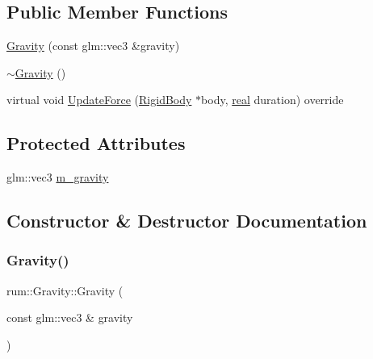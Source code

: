 \subsection*{Public Member Functions}
\begin{DoxyCompactItemize}
\item 
\hyperlink{classrum_1_1_gravity_a9fca05b6d906fec4c40507b0c738dff8}{Gravity} (const glm\+::vec3 \&gravity)
\item 
\hyperlink{classrum_1_1_gravity_a67fc63876df40007e8c7bde5e8a72569}{$\sim$\+Gravity} ()
\item 
virtual void \hyperlink{classrum_1_1_gravity_a721c721904536378636143b21486ea2c}{Update\+Force} (\hyperlink{classrum_1_1_rigid_body}{Rigid\+Body} $\ast$body, \hyperlink{namespacerum_a7e8cca23573d5eaead0f138cbaa4862c}{real} duration) override
\end{DoxyCompactItemize}
\subsection*{Protected Attributes}
\begin{DoxyCompactItemize}
\item 
glm\+::vec3 \hyperlink{classrum_1_1_gravity_a82c9f64363024c45e96ba851a612613b}{m\+\_\+gravity}
\end{DoxyCompactItemize}


\subsection{Constructor \& Destructor Documentation}
\mbox{\label{classrum_1_1_gravity_a9fca05b6d906fec4c40507b0c738dff8}} 
\subsubsection{\texorpdfstring{Gravity()}{Gravity()}}
{\footnotesize\ttfamily rum\+::\+Gravity\+::\+Gravity (\begin{DoxyParamCaption}\item[{const glm\+::vec3 \&}]{gravity }\end{DoxyParamCaption})}

\mbox{\label{classrum_1_1_gravity_a67fc63876df40007e8c7bde5e8a72569}} 
